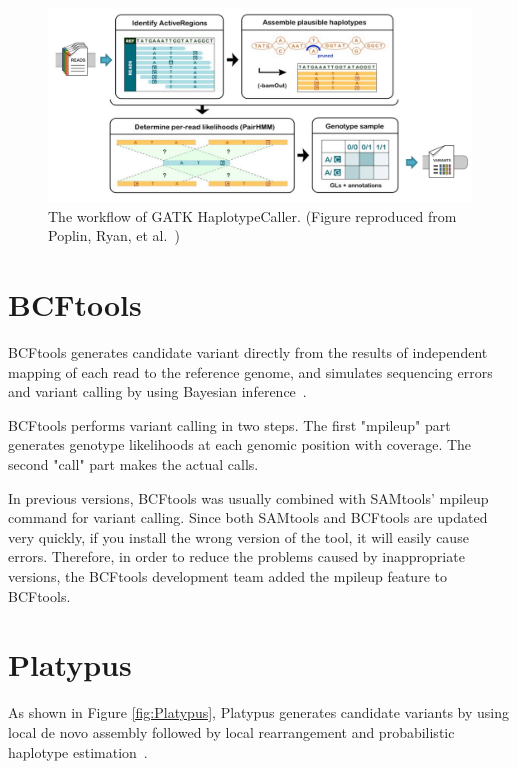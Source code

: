 \documentclass[PhD]{PHlab-thesis}
\begin{document}
\begin{figure}[h!]
	\centering
	\includegraphics[scale=0.25]{figures/GATK_HaplotypeCaller.png}
	\caption{The workflow of GATK HaplotypeCaller. (Figure reproduced from Poplin, Ryan, et al.~\cite{Poplin2018GH})}
	\label{fig:GATK HaplotypeCaller} %
\end{figure}

\section{BCFtools}
BCFtools generates candidate variant directly from the results of independent mapping of each read to the reference genome, and simulates sequencing errors and variant calling by using Bayesian inference~\cite{Li2011SAMtools, Li2010SAMtools}.

BCFtools performs variant calling in two steps. The first "mpileup" part generates genotype likelihoods at each genomic position with coverage. The second "call" part makes the actual calls.

In previous versions, BCFtools was usually combined with SAMtools' mpileup command for variant calling. Since both SAMtools and BCFtools are updated very quickly, if you install the wrong version of the tool, it will easily cause errors. Therefore, in order to reduce the problems caused by inappropriate versions, the BCFtools development team added the mpileup feature to BCFtools.

\section{Platypus}
As shown in Figure \ref{fig:Platypus}, Platypus generates candidate variants by using local de novo assembly followed by local rearrangement and probabilistic haplotype estimation~\cite{Rimmer2014Platypus}.
\end{document}
